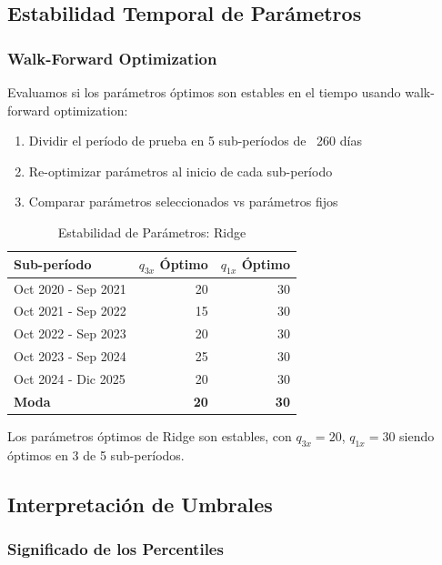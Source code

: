 \subsection{Estabilidad Temporal de Par\'ametros}
\label{app:param_stability}

\subsubsection{Walk-Forward Optimization}

Evaluamos si los par\'ametros \'optimos son estables en el tiempo usando walk-forward optimization:

\begin{enumerate}
    \item Dividir el per\'iodo de prueba en 5 sub-per\'iodos de ~260 d\'ias
    \item Re-optimizar par\'ametros al inicio de cada sub-per\'iodo
    \item Comparar par\'ametros seleccionados vs par\'ametros fijos
\end{enumerate}

\begin{table}[htbp]
\centering
\caption{Estabilidad de Par\'ametros: Ridge}
\label{tab:param_stability}
\begin{tabular}{@{}lrr@{}}
\toprule
\textbf{Sub-per\'iodo} & \textbf{$q_{3x}$ \'Optimo} & \textbf{$q_{1x}$ \'Optimo} \\
\midrule
Oct 2020 - Sep 2021 & 20 & 30 \\
Oct 2021 - Sep 2022 & 15 & 30 \\
Oct 2022 - Sep 2023 & 20 & 30 \\
Oct 2023 - Sep 2024 & 25 & 30 \\
Oct 2024 - Dic 2025 & 20 & 30 \\
\midrule
\textbf{Moda} & \textbf{20} & \textbf{30} \\
\bottomrule
\end{tabular}
\end{table}

Los par\'ametros \'optimos de Ridge son estables, con $q_{3x} = 20$, $q_{1x} = 30$ siendo \'optimos en 3 de 5 sub-per\'iodos.

\subsection{Interpretaci\'on de Umbrales}
\label{app:threshold_interpretation}

\subsubsection{Significado de los Percentiles}

